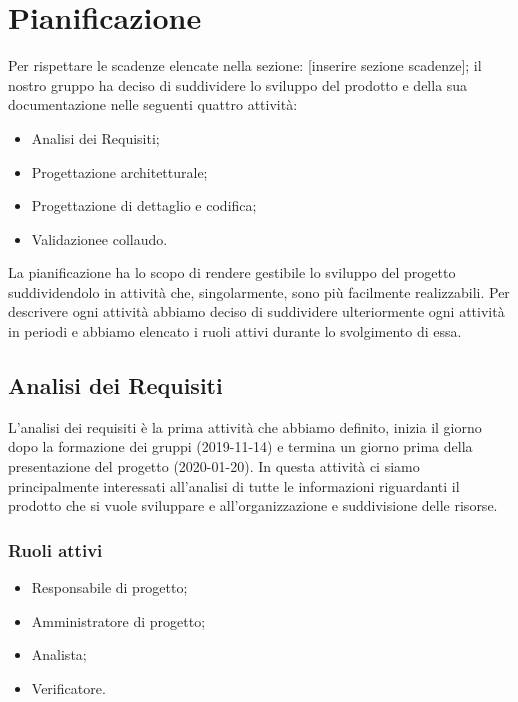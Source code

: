 \section{Pianificazione} 
Per rispettare le scadenze elencate nella sezione: [inserire sezione scadenze]; il nostro gruppo ha deciso di suddividere lo sviluppo del prodotto e della sua documentazione nelle seguenti quattro attività:
\begin{itemize}
	\item Analisi dei Requisiti;
	\item Progettazione architetturale;
	\item Progettazione di dettaglio e codifica;
	\item Validazione\glosp e collaudo.
\end{itemize}
La pianificazione ha lo scopo di rendere gestibile lo sviluppo del progetto suddividendolo in attività che, singolarmente, sono più facilmente realizzabili. Per descrivere ogni attività abbiamo deciso di suddividere ulteriormente ogni attività in periodi e abbiamo elencato i ruoli attivi durante lo svolgimento di essa.

\subsection{Analisi dei Requisiti}
L'analisi dei requisiti è la prima attività che abbiamo definito, inizia il giorno dopo la formazione dei gruppi (2019-11-14) e termina un giorno prima della presentazione del progetto (2020-01-20). In questa attività ci siamo principalmente interessati all'analisi di tutte le informazioni riguardanti il prodotto che si vuole sviluppare e all'organizzazione e suddivisione delle risorse.

\subsubsection{Ruoli attivi}
\begin{itemize}
	\item Responsabile di progetto;
	\item Amministratore di progetto;
	\item Analista;
	\item Verificatore.
\end{itemize}

